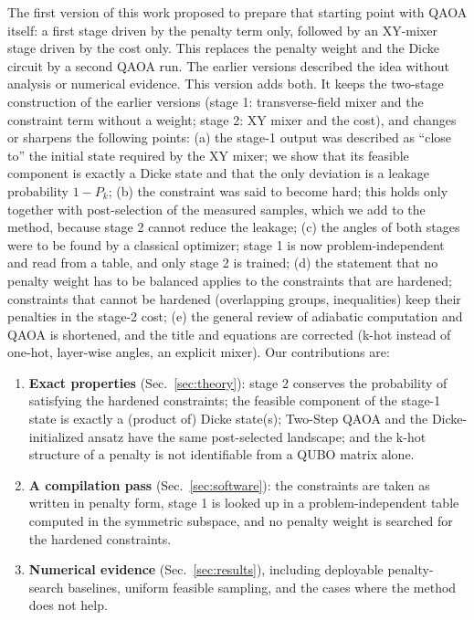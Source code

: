 \documentclass{article}
\begin{document}
The first version of this work proposed to prepare that starting point with QAOA itself: a first stage driven by the penalty term only, followed by an XY-mixer stage driven by the cost only. This replaces the penalty weight and the Dicke circuit by a second QAOA run. The earlier versions described the idea without analysis or numerical evidence.
This version adds both. It keeps the two-stage construction of the earlier versions (stage 1: transverse-field mixer and the constraint term without a weight; stage 2: XY mixer and the cost), and changes or sharpens the following points:
(a) the stage-1 output was described as ``close to'' the initial state required by the XY mixer; we show that its feasible component is exactly a Dicke state and that the only deviation is a leakage probability $1-P_k$;
(b) the constraint was said to become hard; this holds only together with post-selection of the measured samples, which we add to the method, because stage 2 cannot reduce the leakage;
(c) the angles of both stages were to be found by a classical optimizer; stage 1 is now problem-independent and read from a table, and only stage 2 is trained;
(d) the statement that no penalty weight has to be balanced applies to the constraints that are hardened; constraints that cannot be hardened (overlapping groups, inequalities) keep their penalties in the stage-2 cost;
(e) the general review of adiabatic computation and QAOA is shortened, and the title and equations are corrected (k-hot instead of one-hot, layer-wise angles, an explicit mixer).
Our contributions are:
\begin{enumerate}
\item \textbf{Exact properties} (Sec.~\ref{sec:theory}): stage 2 conserves the probability of satisfying the hardened constraints; the feasible component of the stage-1 state is exactly a (product of) Dicke state(s); Two-Step QAOA and the Dicke-initialized ansatz have the same post-selected landscape; and the k-hot structure of a penalty is not identifiable from a QUBO matrix alone.
\item \textbf{A compilation pass} (Sec.~\ref{sec:software}): the constraints are taken as written in penalty form, stage 1 is looked up in a problem-independent table computed in the symmetric subspace, and no penalty weight is searched for the hardened constraints.
\item \textbf{Numerical evidence} (Sec.~\ref{sec:results}), including deployable penalty-search baselines, uniform feasible sampling, and the cases where the method does not help.
\end{enumerate}
\end{document}
